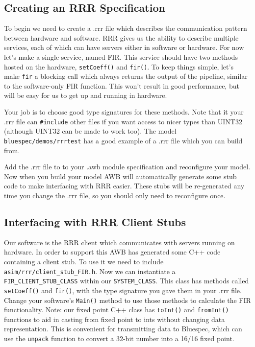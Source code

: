 \documentclass{article}
\begin{document}
\subsection{Creating an RRR Specification}

To begin we need to create a .rrr file which describes the communication pattern between hardware and software. RRR gives us the ability to describe multiple
services, each of which can have servers either in software or hardware. For now let's make a single service, named FIR. This service should have two methods
hosted on the hardware, \texttt{setCoeff()} and \texttt{fir()}. To keep things simple, let's make \texttt{fir} a blocking call which always returns the output of
the pipeline, similar to the software-only FIR function. This won't result in good performance, but will be easy for us to get up and running in hardware.

Your job is to choose good type signatures for these methods. Note that it your .rrr file can \texttt{\#include} other files if you want access to nicer types than
UINT32 (although UINT32 can be made to work too). The model \texttt{bluespec/demos/rrrtest} has a good example of a .rrr file which you can build from.

Add the .rrr file to to your .awb module specification and reconfigure your model. Now when you build your model AWB will automatically generate some stub code to
make interfacing with RRR easier. These stubs will be re-generated any time you change the .rrr file, so you should only need to reconfigure once.

\subsection{Interfacing with RRR Client Stubs}

Our software is the RRR client which communicates with servers running on hardware. In order to support this AWB has generated some C++ code containing a client
stub. To use it we need to include \texttt{asim/rrr/client\_stub\_FIR.h}. Now we can instantiate a \texttt{FIR\_CLIENT\_STUB\_CLASS} within our
\texttt{SYSTEM\_CLASS}. This class has methods called \texttt{setCoeff()} and \texttt{fir()}, with the type signature you gave them in your .rrr file. Change your
software's \texttt{Main()} method to use those methods to calculate the FIR functionality. Note: our fixed point C++ class has \texttt{toInt()} and
\texttt{fromInt()} functions to aid in casting from fixed point to ints without changing data representation. This is convenient for transmitting data to Bluespec,
which can use the \texttt{unpack} function to convert a 32-bit number into a 16/16 fixed point.
\end{document}
